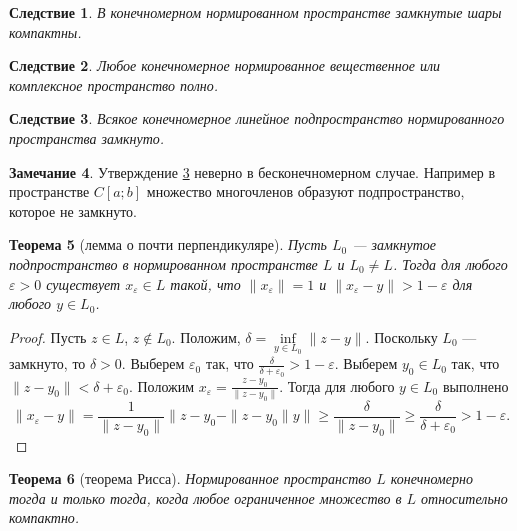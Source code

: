 \documentclass[12pt, titlepage, oneside]{amsbook}
\newtheorem{theorem}{Теорема}[chapter]
\newtheorem{corollary}[theorem]{Следствие}
\theoremstyle{definition}
\newtheorem{remark}[theorem]{Замечание}
\theoremstyle{remark}
\begin{document}
\begin{corollary}
	\label{Nor3}
	В конечномерном нормированном пространстве замкнутые шары компактны.
\end{corollary}

\begin{corollary}
	\label{Nor4}
	Любое конечномерное нормированное вещественное или комплексное пространство полно.
\end{corollary}

\begin{corollary}
	\label{Nor5}
	Всякое конечномерное линейное подпространство нормированного пространства замкнуто.
\end{corollary}

\begin{remark}
	Утверждение \ref{Nor5} неверно в бесконечномерном случае. Например в пространстве $C[a;b]$ множество многочленов образуют подпространство, которое не замкнуто.
\end{remark}


\begin{theorem}[лемма о почти перпендикуляре]
	\label{Nor6}
	Пусть $L_0$ --- замкнутое подпространство в нормированном пространстве $L$ и $L_0\neq L$. Тогда для любого $\varepsilon>0$ существует $x_{\varepsilon}\in L$ такой, что $\|x_{\varepsilon}\|=1$ и $\|x_{\varepsilon}-y\|> 1-\varepsilon$ для любого $y\in L_0$.
\end{theorem}

\begin{proof}
	Пусть $z\in L$, $z\not\in L_0$. Положим, $\delta=\inf\limits_{y\in L_0}\|z-y\|.$ Поскольку $L_0$ --- замкнуто, то $\delta>0$. Выберем $\varepsilon_0$ так, что $\frac{\delta}{\delta+\varepsilon_0}>1-\varepsilon$. Выберем $y_0\in L_0$ так, что $\|z-y_0\|<\delta+\varepsilon_0$. Положим $x_{\varepsilon}=\frac{z-y_0}{\|z-y_0\|}$. Тогда для любого $y\in L_0$ выполнено $$\|x_{\varepsilon}-y\|=\frac{1}{\|z-y_0\|}\|z-y_0-\|z-y_0\|y\|\geq\frac{\delta}{\|z-y_0\|}\geq\frac{\delta}{\delta+\varepsilon_0}>1-\varepsilon.$$
\end{proof}

\begin{theorem}[теорема Рисса]
	\label{Nor7}
	Нормированное пространство $L$ конечномерно тогда и только тогда, когда любое ограниченное множество в $L$ относительно компактно.
\end{theorem}
\end{document}
